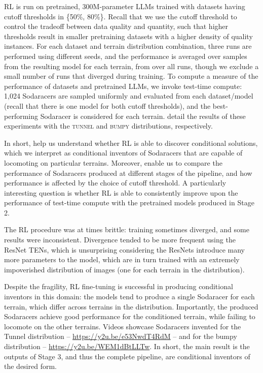 \documentclass{article}
\begin{document}
RL is run on pretrained, 300M-parameter LLMs trained with datasets having cutoff thresholds in \{50\%, 80\%\}. Recall that we use the cutoff threshold to control the tradeoff between data quality and quantity, such that higher thresholds result in smaller pretraining datasets with a higher density of quality instances. For each dataset and terrain distribution combination, three runs are performed using different seeds, and the performance is averaged over samples from the resulting model for each terrain, from over all runs, though we exclude a small number of runs that diverged during training. To compute a measure of the performance of datasets and pretrained LLMs, we invoke test-time compute: 1{,}024 Sodaracers are sampled uniformly and evaluated from each dataset/model (recall that there is one model for both cutoff thresholds), and the best-performing Sodaracer is considered for each terrain.  detail the results of these experiments with the \textsc{tunnel} and \textsc{bumpy} distributions, respectively.

In short,  help us understand whether RL is able to discover conditional solutions, which we interpret as conditional inventors of Sodaracers that are capable of locomoting on particular terrains. Moreover,  enable us to compare the performance of Sodaracers produced at different stages of the pipeline, and how performance is affected by the choice of cutoff threshold. A particularly interesting question is whether RL is able to consistently improve upon the performance of test-time compute with the pretrained models produced in Stage 2. %





The RL procedure was at times brittle: training sometimes diverged, and some results were inconsistent. 
Divergence tended to be more frequent using the ResNet TENs, which is unsurprising considering the ResNets introduce many more parameters to the model, which are in turn trained with an extremely impoverished distribution of images (one for each terrain in the distribution).  %


Despite the fragility, RL fine-tuning is successful in producing conditional inventors in this domain: 
the models tend to produce a single Sodaracer for each terrain, which differ across terrains in the distribution. Importantly, the produced Sodaracers achieve good performance for the conditioned terrain, while failing to locomote on the other terrains. Videos showcase Sodaracers invented for the Tunnel distribution -- \url{https://y2u.be/e53NwdT4RdM} -- and for the bumpy distribution -- \url{https://y2u.be/WEM1dBtLLTw}. In short, the main result is the outputs of Stage 3, and thus the complete pipeline, are conditional inventors of the desired form.
\end{document}
